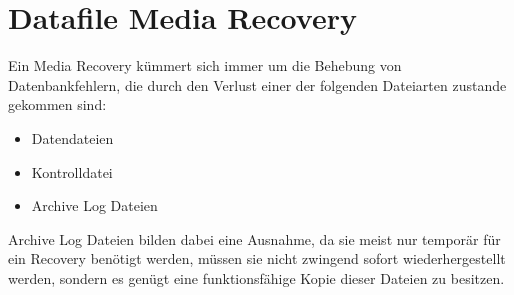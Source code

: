     \section{Datafile Media Recovery}
      Ein Media Recovery k\"ummert sich immer um die Behebung von Datenbankfehlern, die durch den Verlust einer der folgenden Dateiarten zustande gekommen sind:
      \begin{itemize}
        \item Datendateien
        \item Kontrolldatei
        \item Archive Log Dateien
      \end{itemize}
      Archive Log Dateien bilden dabei eine Ausnahme, da sie meist nur tempor\"ar f\"ur ein Recovery ben\"otigt werden, m\"ussen sie nicht zwingend sofort wiederhergestellt werden, sondern es gen\"ugt eine funktionsf\"ahige Kopie dieser Dateien zu besitzen.
